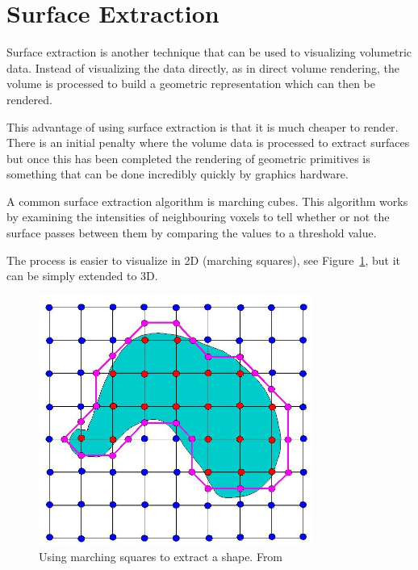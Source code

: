 \section{Surface Extraction}\label{background:surfaceextraction}
Surface extraction is another technique that can be used to visualizing volumetric data. Instead of visualizing the data directly, as in direct volume rendering, the volume is processed to build a geometric representation which can then be rendered.

This advantage of using surface extraction is that it is much cheaper to render\cite{surfacevsvolumerendering}. There is an initial penalty where the volume data is processed to extract surfaces but once this has been completed the rendering of geometric primitives is something that can be done incredibly quickly by graphics hardware.

A common surface extraction algorithm is marching cubes. This algorithm works by examining the intensities of neighbouring voxels to tell whether or not the surface passes between them by comparing the values to a threshold value. 

The process is easier to visualize in 2D (marching squares), see Figure~\ref{fig:marching_squares}, but it can be simply extended to 3D.

\begin{figure}[h]
    \centering
	\includegraphics[width=0.8\textwidth]{images/background/marching_squares.jpg}
    \caption{Using marching squares to extract a shape. From \cite{marching_squares:image}}
    \label{fig:marching_squares}
\end{figure}


